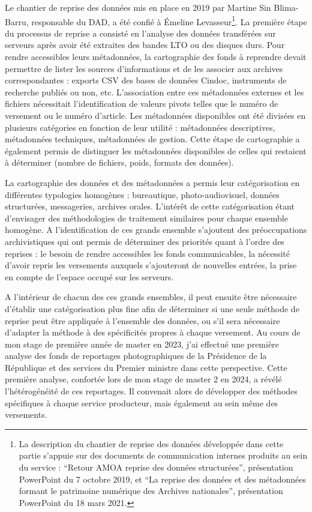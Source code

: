 Le chantier de reprise des données mis en place en 2019 par Martine Sin Blima-Barru, responsable du DAD, a été confié à Émeline Levasseur\footnote{La description du chantier de reprise des données développée dans cette partie s'appuie sur des documents de communication internes produits au sein du service : \enquote{Retour AMOA reprise des données structurées}, présentation PowerPoint du 7 octobre 2019, et \enquote{La reprise des données et des métadonnées formant le patrimoine numérique des Archives nationales}, présentation PowerPoint du 18 mars 2021.}. La première étape du processus de reprise a consisté en l'analyse des données transférées sur serveurs après avoir été extraites des bandes LTO ou des disques durs. Pour rendre accessibles leurs métadonnées, la cartographie des fonds à reprendre devait permettre de lister les sources d'informations et de les associer aux archives correspondantes : exports CSV des bases de données Cindoc, instruments de recherche publiés ou non, etc. L'association entre ces métadonnées externes et les fichiers nécessitait l'identification de valeurs pivots telles que le numéro de versement ou le numéro d'article. Les métadonnées disponibles ont été divisées en plusieurs catégories en fonction de leur utilité : métadonnées descriptives, métadonnées techniques, métadonnées de gestion. Cette étape de cartographie a également permis de distinguer les métadonnées disponibles de celles qui restaient à déterminer (nombre de fichiers, poids, formats des données).

La cartographie des données et des métadonnées a permis leur catégorisation en différentes typologies homogènes : bureautique, photo-audiovisuel, données structurées, messageries, archives orales. L'intérêt de cette catégorisation étant d'envisager des méthodologies de traitement similaires pour chaque ensemble homogène. A l'identification de ces grands ensemble s'ajoutent des préoccupations archivistiques qui ont permis de déterminer des priorités quant à l'ordre des reprises : le besoin de rendre accessibles les fonds communicables, la nécessité d'avoir repris les versements auxquels s'ajouteront de nouvelles entrées, la prise en compte de l'espace occupé sur les serveurs.

A l'intérieur de chacun des ces grands ensembles, il peut ensuite être nécessaire d'établir une catégorisation plus fine afin de déterminer si une seule méthode de reprise peut être appliquée à l'ensemble des données, ou s'il sera nécessaire d'adapter la méthode à des spécificités propres à chaque versement. Au cours de mon stage de première année de master en 2023, j'ai effectué une première analyse des fonds de reportages photographiques de la Présidence de la République et des services du Premier ministre dans cette perspective. Cette première analyse, confortée lors de mon stage de master 2 en 2024, a révélé l'hétérogénéité de ces reportages. Il convenait alors de développer des méthodes spécifiques à chaque service producteur, mais également au sein même des versements.


